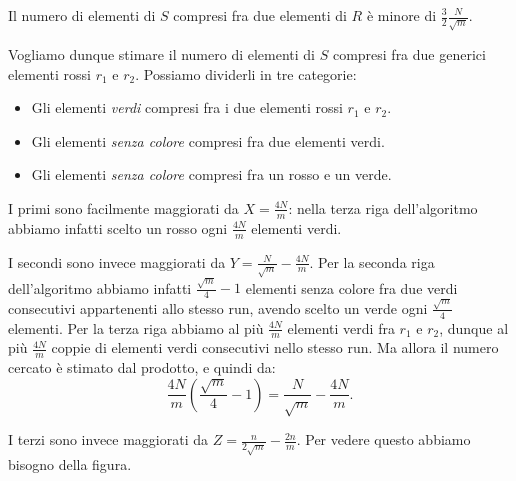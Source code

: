 \begin{lemma}[Correttezza]
    Il numero di elementi di \(S\) compresi fra due elementi di \(R\) \`e
    minore di \(\frac{3}{2}\frac{N}{\sqrt{m}}\).
\end{lemma}
\begin{proof*}
    Vogliamo dunque stimare il numero di elementi di \(S\) compresi fra
    due generici elementi rossi \(r_1\) e \(r_2\). Possiamo dividerli in
    tre categorie:
    \begin{itemize}
        \item Gli elementi \emph{verdi} compresi fra i due elementi rossi \(r_1\) e \(r_2\).
        \item Gli elementi \emph{senza colore} compresi fra due elementi verdi.
        \item Gli elementi \emph{senza colore} compresi fra un rosso e un verde.
    \end{itemize}
        
    I primi sono facilmente maggiorati da \(X = \frac{4N}{m}\): nella 
    terza riga dell'algoritmo abbiamo infatti scelto un rosso ogni 
    \(\frac{4N}{m}\) elementi verdi.
        
    I secondi sono invece maggiorati da \(Y = \frac{N}{\sqrt{m}} - \frac{4N}{m}\). Per la seconda riga dell'algoritmo abbiamo infatti 
    \(\frac{\sqrt{m}}{4}-1\) elementi senza colore fra due verdi
    consecutivi appartenenti allo stesso run, avendo scelto un verde ogni
    \(\frac{\sqrt{m}}{4}\) elementi. Per la terza riga abbiamo al pi\`u
    \(\frac{4N}{m}\) elementi verdi fra \(r_1\) e \(r_2\), dunque al
    pi\`u \(\frac{4N}{m}\) coppie di elementi verdi consecutivi nello
    stesso run. Ma allora il numero cercato \`e stimato dal prodotto, e 
    quindi da:
    \[
        \frac{4N}{m}\left(\frac{\sqrt{m}}{4}-1\right) = \frac{N}{\sqrt{m}} - \frac{4N}{m}\mbox{.}
    \]
        
    I terzi sono invece maggiorati da \(Z = \frac{n}{2\sqrt{m}} - \frac{2n}{m}\). Per vedere questo abbiamo bisogno della figura.
    \begin{figure}
        \centering
\end{figure}
\end{proof*}
